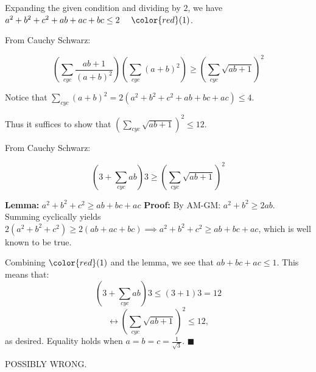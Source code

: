 Expanding the given condition and dividing by $2$, we have $a^2+b^2+c^2+ab+ac+bc\le 2~~~~\color{red}(1)$.

From Cauchy Schwarz:

$$\left(\sum_{cyc}\frac{ab+1}{(a+b)^2}\right)\left(\sum_{cyc}(a+b)^2\right)\ge \left(\sum_{cyc}\sqrt{ab+1}\right)^2$$  

Notice that $\sum_{cyc}(a+b)^2=2(a^2+b^2+c^2+ab+bc+ac)\le 4$. 

Thus it suffices to show that $\left(\sum_{cyc}\sqrt{ab+1}\right)^2\le 12$.

From Cauchy Schwarz:

$$\left(3+\sum_{cyc}ab\right)3\ge \left(\sum_{cyc}\sqrt{ab+1}\right)^2$$

\textbf{Lemma:} $a^2+b^2+c^2\ge ab+bc+ac$
\textbf{Proof:} By AM-GM: $a^2+b^2\ge 2ab$. Summing cyclically yields $2(a^2+b^2+c^2)\ge 2(ab+ac+bc)\implies a^2+b^2+c^2\ge ab+bc+ac$, which is well known to be true.

Combining $\color{red}(1)$ and the lemma, we see that $ab+bc+ac\le 1$. This means that:
$$\left(3+\sum_{cyc}ab\right)3\le (3+1)3=12$$
$$\leftrightarrow \left(\sum_{cyc}\sqrt{ab+1}\right)^2\le 12,$$
as desired. Equality holds when $a=b=c=\frac{1}{\sqrt{3}}$. $\blacksquare$



POSSIBLY WRONG.
